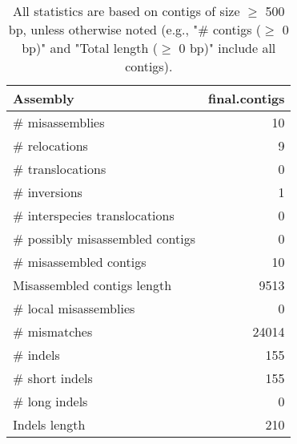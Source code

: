 \documentclass[12pt,a4paper]{article}
\begin{document}
\begin{table}[ht]
\begin{center}
\caption{All statistics are based on contigs of size $\geq$ 500 bp, unless otherwise noted (e.g., "\# contigs ($\geq$ 0 bp)" and "Total length ($\geq$ 0 bp)" include all contigs).}
\begin{tabular}{|l*{1}{|r}|}
\hline
Assembly & final.contigs \\ \hline
\# misassemblies & 10 \\ \hline
\hspace{5mm}\# relocations & 9 \\ \hline
\hspace{5mm}\# translocations & 0 \\ \hline
\hspace{5mm}\# inversions & 1 \\ \hline
\hspace{5mm}\# interspecies translocations & 0 \\ \hline
\# possibly misassembled contigs & 0 \\ \hline
\# misassembled contigs & 10 \\ \hline
Misassembled contigs length & 9513 \\ \hline
\# local misassemblies & 0 \\ \hline
\# mismatches & 24014 \\ \hline
\# indels & 155 \\ \hline
\hspace{5mm}\# short indels & 155 \\ \hline
\hspace{5mm}\# long indels & 0 \\ \hline
Indels length & 210 \\ \hline
\end{tabular}
\end{center}
\end{table}
\end{document}
